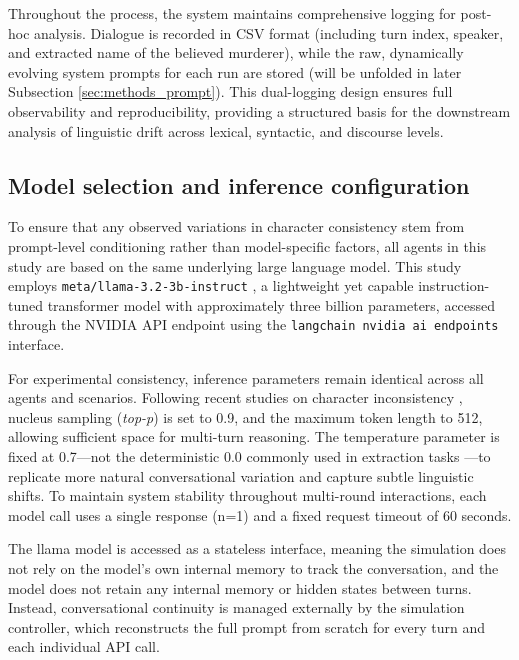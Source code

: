 \documentclass{article}
\begin{document}
Throughout the process, the system maintains comprehensive logging for post-hoc analysis. Dialogue is recorded in CSV format (including turn index, speaker, and extracted name of the believed murderer), while the raw, dynamically evolving system prompts for each run are stored (will be unfolded in later Subsection \ref{sec:methods_prompt}). This dual-logging design ensures full observability and reproducibility, providing a structured basis for the downstream analysis of linguistic drift across lexical, syntactic, and discourse levels. 

\subsection{Model selection and inference configuration} \label{sec:methods_model}

To ensure that any observed variations in character consistency stem from prompt-level conditioning rather than model-specific factors, all agents in this study are based on the same underlying large language model. This study employs \texttt{meta/llama-3.2-3b-instruct} \citep{llama3.2}, a lightweight yet capable instruction-tuned transformer model with approximately three billion parameters, accessed through the NVIDIA API endpoint using the \texttt{langchain nvidia ai endpoints} interface.

For experimental consistency, inference parameters remain identical across all agents and scenarios. Following recent studies on character inconsistency \citep{choi2024examining}, nucleus sampling (\textit{top-p}) is set to 0.9, and the maximum token length to 512, allowing sufficient space for multi-turn reasoning. The temperature parameter is fixed at 0.7—not the deterministic 0.0 commonly used in extraction tasks \citep{delima2025detective}—to replicate more natural conversational variation and capture subtle linguistic shifts. To maintain system stability throughout multi-round interactions, each model call uses a single response (n=1) and a fixed request timeout of 60 seconds.

The llama model is accessed as a stateless interface, meaning the simulation does not rely on the model's own internal memory to track the conversation, and the model does not retain any internal memory or hidden states between turns. Instead, conversational continuity is managed externally by the simulation controller, which reconstructs the full prompt from scratch for every turn and each individual API call.
\end{document}
